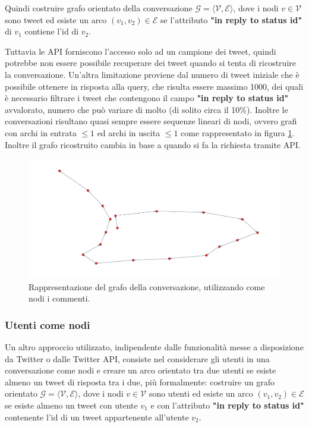 Quindi costruire grafo orientato della conversazione $\mathcal{G = ⟨V, E⟩}$, dove i nodi $v \in \mathcal{V}$ sono tweet ed esiste un arco $(v_1,v_2) \in \mathcal{E}$ se l'attributo \textbf{"in reply to status id"} di $v_1$ contiene l'id di $v_2$.

Tuttavia le API forniscono l'accesso solo ad un campione dei tweet, quindi potrebbe non essere possibile recuperare dei tweet quando si tenta di ricostruire la conversazione. Un'altra limitazione proviene dal numero di tweet iniziale che è possibile ottenere in risposta alla query, che risulta essere massimo 1000, dei quali è necessario filtrare i tweet che contengono il campo \textbf{"in reply to status id"} avvalorato, numero che può variare di molto (di solito circa il 10\%). Inoltre le conversazioni risultano quasi sempre essere sequenze lineari di nodi, ovvero grafi con archi in entrata $\leq 1$ ed archi in uscita $\leq 1$ come rappresentato in figura \ref{fig:comment-twitter}. Inoltre il grafo ricostruito cambia in base a quando si fa la richiesta tramite API.

\begin{figure}[ht]
    \includegraphics[width=\linewidth]{Immagini/twitter.png}
    \caption{Rappresentazione del grafo della conversazione, utilizzando come nodi i commenti.}
    \label{fig:comment-twitter}
\end{figure}

\subsubsection {Utenti come nodi}
Un altro approccio utilizzato, indipendente dalle funzionalità messe a disposizione da Twitter o dalle Twitter API, consiste nel considerare gli utenti in una conversazione come nodi e creare un arco orientato tra due utenti se esiste almeno un tweet di risposta tra i due, più formalmente: costruire un grafo orientato $\mathcal{G = ⟨V, E⟩}$, dove i nodi $v \in \mathcal{V}$ sono utenti ed esiste un arco $(v_1,v_2) \in \mathcal{E}$ se esiste almeno un tweet con utente $v_1$ e con l'attributo \textbf{"in reply to status id"} contenente l'id di un tweet appartenente all'utente $v_2$.

